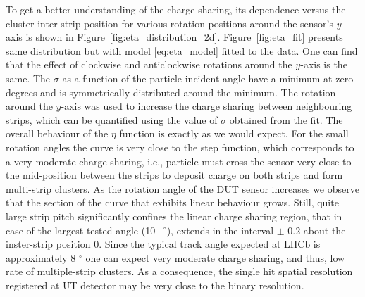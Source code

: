 To get a better understanding of the charge sharing, its dependence versus the cluster inter-strip position for various rotation positions around the sensor's $y$-axis is shown in Figure~\ref{fig:eta_distribution_2d}. Figure~\ref{fig:eta_fit} presents same distribution but with model \ref{eq:eta_model} fitted to the data. One can find that the effect of clockwise and anticlockwise rotations around the $y$-axis is the same.  The $\sigma$ as a function
of the particle incident angle have a minimum at zero degrees and is symmetrically distributed around the minimum. The rotation around the $y$-axis was used to increase the charge sharing between neighbouring strips, which can be quantified using the value of $\sigma$ obtained from the fit. The overall behaviour of the $\eta$ function is exactly as we would expect. For the small rotation angles the curve is very close to the step function, which corresponds to a very moderate charge sharing, i.e., particle must cross the sensor very close to the mid-position between the strips to deposit charge on both strips and form multi-strip clusters. As the rotation angle of the DUT sensor increases we observe that the section of the curve that exhibits linear behaviour grows. Still, quite large strip pitch significantly confines the linear charge sharing region, that in case of the largest tested angle (10 ~$^{\circ}$), extends in the interval $\pm$ 0.2 about the inster-strip position 0. Since the typical track angle expected at LHCb is approximately 8 $^{\circ}$ one can expect very moderate charge sharing, and thus, low rate of multiple-strip clusters. As a consequence, the single hit spatial resolution registered at UT detector may be very close to the binary resolution.

